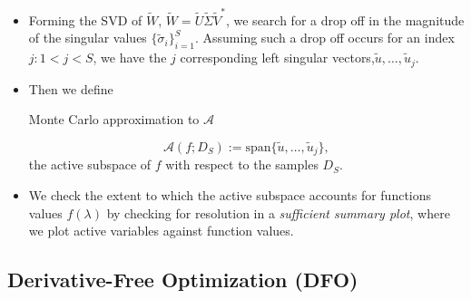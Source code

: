 \documentclass[11pt]{beamer}
\newcommand{\A}{\mathcal{A}}
\begin{document}
\begin{frame}

\begin{itemize}

	\item Forming the SVD of $\tilde{W}$, $\tilde{W}=\tilde{U}\tilde{\Sigma}\tilde{V}^*$, we search for a drop off in the magnitude of the singular values $\{\tilde{\sigma}_i\}_{i=1}^S$. Assuming such a drop off occurs for an index $j:1<j<S$, we have the $j$ corresponding left singular vectors,$ \tilde{u},\ldots,\tilde{u}_{j}$.  
	
	\item Then we define

	\begin{block}{Monte Carlo approximation to $\A$}
	
	
	$$\A\left(f; D_S \right):=\text{span}\{\tilde{u},\ldots,\tilde{u}_{j}\},$$ the active subspace of $f$ with respect to the samples $D_S$.
	
	\end{block}		

	\item We check the extent to which the active subspace accounts for functions values $f(\lambda)$ 
by checking for resolution in a \emph{sufficient summary plot}, where we plot active variables against function values.


\end{itemize}


\end{frame}

\subsection{Derivative-Free Optimization (DFO)}
\end{document}
